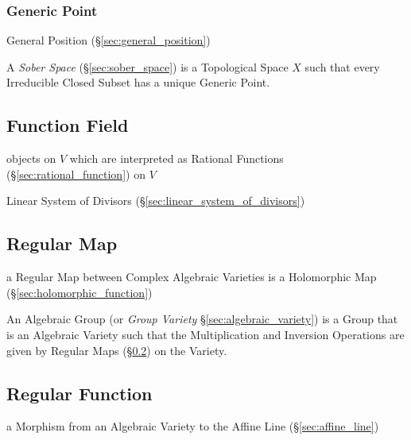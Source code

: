 \subsubsection{Generic Point}\label{sec:generic_point}

\fist General Position (\S\ref{sec:general_position})

\fist A \emph{Sober Space} (\S\ref{sec:sober_space}) is a Topological Space $X$
such that every Irreducible Closed Subset has a unique Generic Point.



\subsection{Function Field}\label{sec:function_field}

objects on $V$ which are interpreted as Rational Functions
(\S\ref{sec:rational_function}) on $V$

\fist Linear System of Divisors (\S\ref{sec:linear_system_of_divisors})



\subsection{Regular Map}\label{sec:regular_map}

a Regular Map between Complex Algebraic Varieties is a Holomorphic Map
(\S\ref{sec:holomorphic_function})

An Algebraic Group (or \emph{Group Variety} \S\ref{sec:algebraic_variety}) is a
Group that is an Algebraic Variety such that the Multiplication and Inversion
Operations are given by Regular Maps (\S\ref{sec:regular_map}) on the Variety.



\subsection{Regular Function}\label{sec:regular_function}

a Morphism from an Algebraic Variety to the Affine Line
(\S\ref{sec:affine_line})




